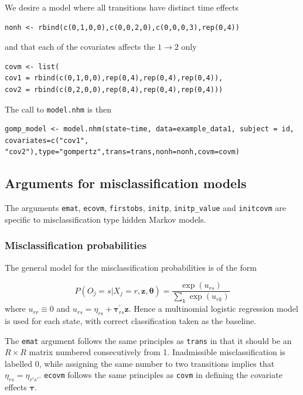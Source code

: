 \documentclass{article}
\numberwithin{equation}{section}
\begin{document}
We desire a model where all transitions have distinct time effects

\begin{verbatim}
nonh <- rbind(c(0,1,0,0),c(0,0,2,0),c(0,0,0,3),rep(0,4))
\end{verbatim}

and that each of the covariates affects the $1 \rightarrow 2$ only

\begin{verbatim}
covm <- list(
cov1 = rbind(c(0,1,0,0),rep(0,4),rep(0,4),rep(0,4)),
cov2 = rbind(c(0,2,0,0),rep(0,4),rep(0,4),rep(0,4)))
\end{verbatim}

The call to \verb!model.nhm! is then

\begin{verbatim}
gomp_model <- model.nhm(state~time, data=example_data1, subject = id, covariates=c("cov1",
"cov2"),type="gompertz",trans=trans,nonh=nonh,covm=covm)
\end{verbatim}

\subsection{Arguments for misclassification models}
\label{miscarg_sec}

The arguments \verb!emat!, \verb!ecovm!, \verb!firstobs!, \verb!initp!, \verb!initp_value! and \verb!initcovm! are specific to misclassification type hidden Markov models.

\subsubsection{Misclassification probabilities}

The general model for the misclassification probabilities is of the form

$$P(O_j = s | X_j = r, \mathbf{z}, \bm\theta) = \frac{\exp( u_{rs})}{\sum_{k} \exp(u_{rk})}$$
where $u_{rr} \equiv 0$ and $u_{rs} = \eta_{rs} + \bm\tau_{rs}^{'}\mathbf{z}.$
Hence a multinomial logistic regression model is used for each state, with correct classification taken as the baseline.

The \verb!emat! argument follows the same principles as \verb!trans! in that it should be an $R \times R$ matrix numbered consecutively from 1. Inadmissible misclassification is labelled 0, while assigning the same number to two transitions implies that $\eta_{rs} = \eta_{r's'}$.
\verb!ecovm! follows the same principles as \verb!covm! in defining the covariate effects $\bm\tau$.
\end{document}
